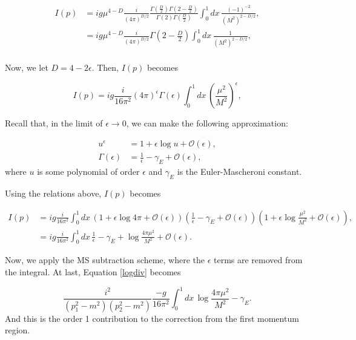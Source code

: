 \documentclass{article}
\begin{document}
\begin{equation}
    \begin{split}
        I(p) &= ig\mu^{4-D} \frac{i}{(4\pi)^{D/2}}\frac{\Gamma(\frac{D}{2})\Gamma(2-\frac{D}{2})}{\Gamma(2)\Gamma(\frac{D}{2})}\int^1_0 dx \, \frac{(-1)^{-2}}{(M^2)^{2-D/2}},\\
        &= ig\mu^{4-D} \frac{i}{(4\pi)^{D/2}}\Gamma(2-\frac{D}{2})\int^1_0 dx \, \frac{1}{(M^2)^{2-D/2}},\\
    \end{split}
\end{equation}

Now, we let $D=4-2\epsilon$. Then, $I(p)$ becomes

\begin{equation}
    I(p)=ig\frac{i}{16\pi^2}(4\pi)^{\epsilon}\Gamma(\epsilon)\int^1_0 dx \, \left(\frac{\mu^2}{M^2}\right)^{\epsilon},
\end{equation}

Recall that, in the limit of $\epsilon\rightarrow 0$, we can make the following approximation:

\begin{equation}
\begin{split}
    u^\epsilon &= 1 + \epsilon \log{u} + \mathcal{O}(\epsilon),\\
    \Gamma(\epsilon) &= \frac{1}{\epsilon} - \gamma_E + \mathcal{O}(\epsilon),
\end{split}
\end{equation}
where $u$ is some polynomial of order $\epsilon$ and $\gamma_E$ is the Euler-Mascheroni constant.

Using the relations above, $I(p)$ becomes

\begin{equation}
    \begin{split}
       I(p)&=ig\frac{i}{16\pi^2}\int^1_0 dx \, (1+\epsilon\log{4\pi} + \mathcal{O}(\epsilon))(\frac{1}{\epsilon} - \gamma_E + \mathcal{O}(\epsilon))(1+\epsilon\log{\frac{\mu^2}{M^2}}+ \mathcal{O}(\epsilon)),\\
       &=ig\frac{i}{16\pi^2}\int^1_0 dx \, \frac{1}{\epsilon} - \gamma_E + \log{\frac{4\pi\mu^2}{M^2}} + \mathcal{O}(\epsilon).
    \end{split}
\end{equation}

Now, we apply the MS subtraction scheme, where the $\epsilon$ terms are removed from the integral. At last, Equation \ref{logdiv} becomes 

\begin{equation}
     \frac{i^2}{(p_1^2-m^2)(p_2^2-m^2)}\frac{-g}{16\pi^2}\int^1_0 dx \, \log{\frac{4\pi\mu^2}{M^2}} - \gamma_E.
\end{equation}
And this is the order 1 contribution to the correction from the first momentum region.
\end{document}
